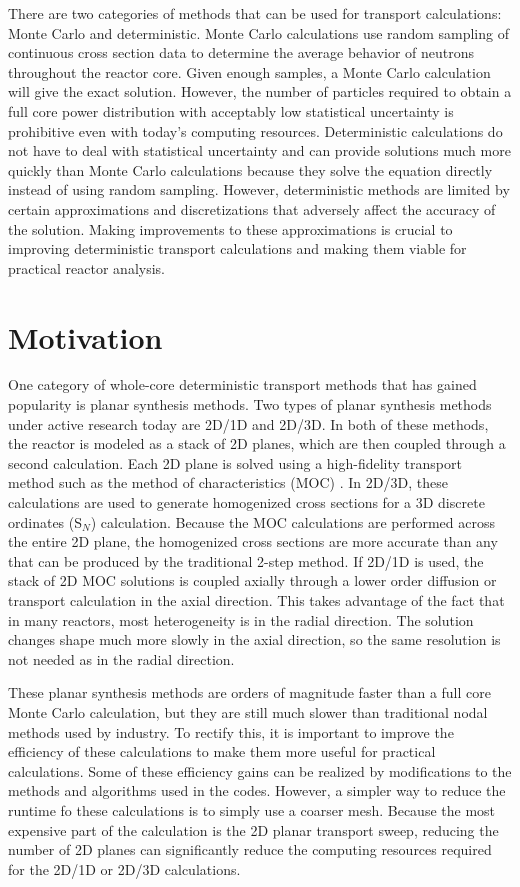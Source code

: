 There are two categories of methods that can be used for transport calculations: Monte Carlo and deterministic.  Monte Carlo calculations use random sampling of continuous cross section data to determine the average behavior of neutrons throughout the reactor core.  Given enough samples, a Monte Carlo calculation will give the exact solution.  However, the number of particles required to obtain a full core power distribution with acceptably low statistical uncertainty is prohibitive even with today's computing resources.  Deterministic calculations do not have to deal with statistical uncertainty and can provide solutions much more quickly than Monte Carlo calculations because they solve the equation directly instead of using random sampling.  However, deterministic methods are limited by certain approximations and discretizations that adversely affect the accuracy of the solution.  Making improvements to these approximations is crucial to improving deterministic transport calculations and making them viable for practical reactor analysis.

\section{Motivation}

One category of whole-core deterministic transport methods that has gained popularity is planar synthesis methods.  Two types of planar synthesis methods under active research today are 2D/1D and 2D/3D.  In both of these methods, the reactor is modeled as a stack of 2D planes, which are then coupled through a second calculation.  Each 2D plane is solved using a high-fidelity transport method such as the method of characteristics (MOC) \cite{HalsallMOCOrigCACTUS1980}.  In 2D/3D, these calculations are used to generate homogenized cross sections for a 3D discrete ordinates (S$_N$) calculation.  Because the MOC calculations are performed across the entire 2D plane, the homogenized cross sections are more accurate than any that can be produced by the traditional 2-step method.  If 2D/1D is used, the stack of 2D MOC solutions is coupled axially through a lower order diffusion or transport calculation in the axial direction.  This takes advantage of the fact that in many reactors, most heterogeneity is in the radial direction.  The solution changes shape much more slowly in the axial direction, so the same resolution is not needed as in the radial direction.

These planar synthesis methods are orders of magnitude faster than a full core Monte Carlo calculation, but they are still much slower than traditional nodal methods used by industry.  To rectify this, it is important to improve the efficiency of these calculations to make them more useful for practical calculations.  Some of these efficiency gains can be realized by modifications to the methods and algorithms used in the codes.  However, a simpler way to reduce the runtime fo these calculations is to simply use a coarser mesh.  Because the most expensive part of the calculation is the 2D planar transport sweep, reducing the number of 2D planes can significantly reduce the computing resources required for the 2D/1D or 2D/3D calculations.


